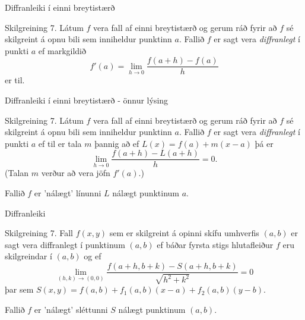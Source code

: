\date{26.~janúar 2015}



\begin{frame}
	\maketitle
\end{frame}




\begin{frame}{Diffranleiki í einni breytistærð} 

\begin {block}{Skilgreining 7. }
  Látum $f$ vera fall af einni breytistærð og gerum ráð fyrir að $f$ sé
skilgreint á opnu bili sem inniheldur punktinn $a$.  Fallið $f$ er
sagt vera {\em diffranlegt} í punkti $a$ ef markgildið
$$f'(a)=\lim_{h\rightarrow 0}\frac{f(a+h)-f(a)}{h}$$
er til.

\end{block}

\end{frame}



\begin{frame}{Diffranleiki í einni breytistærð - önnur lýsing} 

\begin {block}{Skilgreining 7. }
Látum $f$ vera fall af einni breytistærð og gerum ráð fyrir að $f$ sé
skilgreint á opnu bili sem inniheldur punktinn $a$.  Fallið $f$ er
sagt vera {\em diffranlegt} í punkti $a$ ef til er tala $m$ þannig að
ef $L(x)=f(a)+m(x-a)$ þá er 
$$\lim_{h\rightarrow 0}\frac{f(a+h)-L(a+h)}{h}=0.$$
(Talan $m$ verður að vera jöfn $f'(a)$.)

\end{block}
\bigskip
Fallið $f$ er 'nálægt' línunni $L$ nálægt punktinum $a$.
\end{frame}

\begin{frame}{Diffranleiki} 

\begin {block}{Skilgreining 7.}
Fall $f(x,y)$ sem er skilgreint á opinni
skífu umhverfis $(a,b)$ er sagt vera diffranlegt í punktinum $(a,b)$
ef báðar fyrsta stigs hlutafleiður $f$ eru skilgreindar í $(a,b)$ og ef 
$$\lim_{(h,k)\rightarrow (0,0)}
\frac{f(a+h, b+k)-S(a+h,b+k)}{\sqrt{h^2+k^2}}=0$$
þar sem $S(x,y) = f(a,b) + f_1(a,b)(x-a)+f_2(a,b)(y-b)$.
\end{block}
\bigskip
Fallið $f$ er 'nálægt' sléttunni $S$ nálægt punktinum $(a,b)$.
\end{frame}

